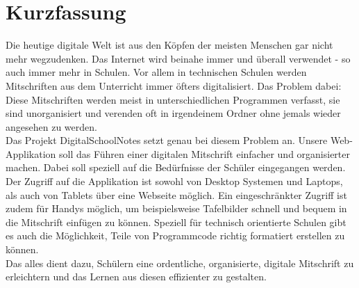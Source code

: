 \section*{Kurzfassung}

Die heutige digitale Welt ist aus den Köpfen der meisten Menschen gar nicht mehr wegzudenken. Das Internet wird beinahe immer und überall verwendet - so auch immer mehr in Schulen. Vor allem in technischen Schulen werden Mitschriften aus dem Unterricht immer öfters digitalisiert. Das Problem dabei: Diese Mitschriften werden meist in unterschiedlichen Programmen verfasst, sie sind unorganisiert und verenden oft in irgendeinem Ordner ohne jemals wieder angesehen zu werden.\\
Das Projekt DigitalSchoolNotes setzt genau bei diesem Problem an. Unsere Web-Applikation soll das Führen einer digitalen Mitschrift einfacher und organisierter machen. Dabei soll speziell auf die Bedürfnisse der Schüler eingegangen werden. Der Zugriff auf die Applikation ist sowohl von Desktop Systemen und Laptops, als auch von Tablets über eine Webseite möglich. Ein eingeschränkter Zugriff ist zudem für Handys möglich, um beispielsweise Tafelbilder schnell und bequem in die Mitschrift einfügen zu können. Speziell für technisch orientierte Schulen gibt es auch die Möglichkeit, Teile von Programmcode richtig formatiert erstellen zu können. \\
Das alles dient dazu, Schülern eine ordentliche, organisierte, digitale Mitschrift zu erleichtern und das Lernen aus diesen effizienter zu gestalten.
